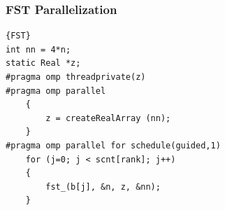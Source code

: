 \documentclass{article}
\begin{document}
\subsubsection{FST Parallelization \label{sub:fst}}
\begin{lstlisting}[caption=Parallelizing the FST function]{FST}
int nn = 4*n;
static Real *z;
#pragma omp threadprivate(z)
#pragma omp parallel
    {
        z = createRealArray (nn);
    }
#pragma omp parallel for schedule(guided,1)
    for (j=0; j < scnt[rank]; j++)
    {
        fst_(b[j], &n, z, &nn);
    }
\end{lstlisting}
\end{document}
